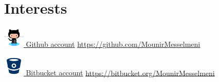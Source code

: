 \documentclass[11pt,a4paper,sans]{moderncv} %
\begin{document}

\section{Interests}

\renewcommand{\listitemsymbol}{-~} %


\href{https://github.com/MounirMesselmeni}{\includegraphics[width=1cm,height=1cm]{pictures/github.png}
Github account}
\url{https://github.com/MounirMesselmeni}

\href{https://bitbucket.org/MounirMesselmeni}{\includegraphics[width=1cm,height=1cm]{pictures/bitbucket.png}
Bitbucket account}
\url{https://bitbucket.org/MounirMesselmeni}





% 
% 
% 
% 
% 
% 

\end{document}
